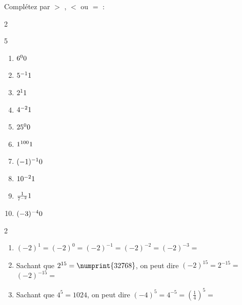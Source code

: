 \documentclass[main.tex]{subfiles}
\begin{document}
 \begin{exercise}[\cancel{\faCalculator}]	Complétez par $>$ , $<$ ou $=$ :\hfill \vspace{-1.5em}
 	\begin{spacing}{2}
 		\begin{multicols}{5}
 			\begin{enumerate}[label={},leftmargin=*]  
 				\item $6^0\dotfill 0$
 				\item $5^{-1}\dotfill 1$
 				\item $2^1\dotfill 1$
 				\item $4^{-2}\dotfill 1$
 				\item $25^0\dotfill 0$
 				\item $1^{100}\dotfill 1$
 				\item $(-1)^{-1}\dotfill 0$
 				\item $10^{-2}\dotfill 1$
 				\item $\frac{1}{7^{-2}}\dotfill 1$ 
 				\item $(-3)^{-4}\dotfill 0$     
 			\end{enumerate}
 		\end{multicols}
 	\end{spacing}
 	\vspace{-1.5em}
 \end{exercise}
 \begin{exercise}[\cancel{\faCalculator}]\hfill \vspace{-0.5em}
 	\begin{spacing}{2}
 			\begin{enumerate}[label={\arabic*)},leftmargin=*]
 				\item $(-2)^{1}=$\dotfill$(-2)^{0}=$\dotfill $(-2)^{-1}=$\dotfill$(-2)^{-2}=$\dotfill$(-2)^{-3}=$\dotfill 
 				\item Sachant que $2^{15}=\numprint{32768}$, on peut dire $(-2)^{15}=$\dotfill  $2^{-15}=$\dotfill$(-2)^{-15}=$\dotfill 
 				\item Sachant que $4^5=1024$, on peut dire $(-4)^5=$\dotfill  $4^{-5}=$\dotfill$\left(\frac{1}{4}\right)^5=$\dotfill 
 			\end{enumerate}
 	\end{spacing}
 	\vspace{-1em} 
 \end{exercise} 
\end{document}
